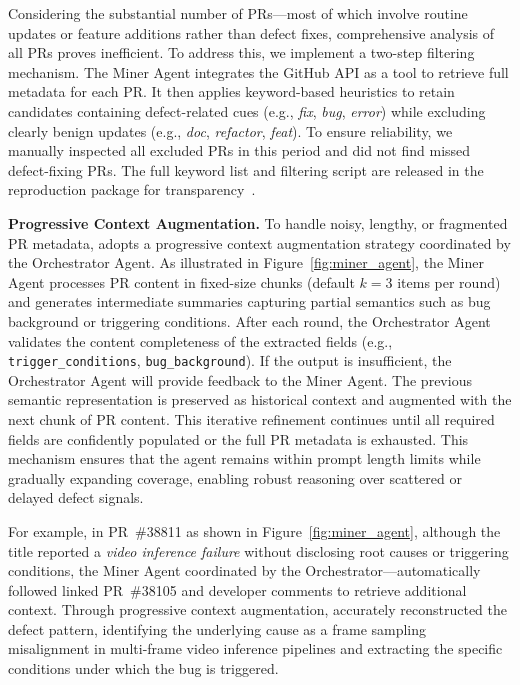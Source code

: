 Considering the substantial number of PRs—most of which involve routine updates or feature additions rather than defect fixes, comprehensive analysis of all PRs proves inefficient. 
To address this, we implement a two-step filtering mechanism.
The Miner Agent integrates the GitHub API as a tool to retrieve full metadata for each PR.
It then applies keyword-based heuristics to retain candidates containing defect-related cues (e.g., \textit{fix}, \textit{bug}, \textit{error}) while excluding clearly benign updates (e.g., \textit{doc}, \textit{refactor}, \textit{feat}).
To ensure reliability, we manually inspected all excluded PRs in this period and did not find missed defect-fixing PRs.
The full keyword list and filtering script are released in the reproduction package for transparency~\cite{depradar}.

\noindent \textbf{Progressive Context Augmentation.}
To handle noisy, lengthy, or fragmented PR metadata, \appname adopts a progressive context augmentation strategy coordinated by the Orchestrator Agent.
As illustrated in Figure~\ref{fig:miner_agent}, the Miner Agent processes PR content in fixed-size chunks (default $k=3$ items per round) and generates intermediate summaries capturing partial semantics such as bug background or triggering conditions.
After each round, the Orchestrator Agent validates the content completeness of the extracted fields (e.g., \texttt{trigger\_conditions}, \texttt{bug\_background}).
If the output is insufficient, the Orchestrator Agent  will provide feedback to the Miner Agent. 
The previous semantic representation is preserved as historical context and augmented with the next chunk of PR content.
This iterative refinement continues until all required fields are confidently populated or the full PR metadata is exhausted.
This mechanism ensures that the agent remains within prompt length limits while gradually expanding coverage, enabling robust reasoning over scattered or delayed defect signals.

For example, in PR~\#38811 as shown in Figure~\ref{fig:miner_agent}, although the title reported a \textit{video inference failure} without disclosing root causes or triggering conditions, the Miner Agent coordinated by the Orchestrator—automatically followed linked PR~\#38105 and developer comments to retrieve additional context. 
Through progressive context augmentation, \appname accurately reconstructed the defect pattern, identifying the underlying cause as a frame sampling misalignment in multi-frame video inference pipelines and extracting the specific conditions under which the bug is triggered.

